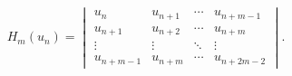 \[H_{m}(u_{n})=\begin{vmatrix}u_{n}&u_{n+1}&\cdots&u_{n+m-1}\\
u_{n+1}&u_{n+2}&\cdots&u_{n+m}\\
\vdots&\vdots&\ddots&\vdots\\
u_{n+m-1}&u_{n+m}&\cdots&u_{n+2m-2}\end{vmatrix}.\]